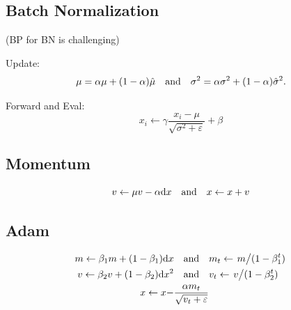 \documentclass[a4paper,landscape]{article}
\begin{document}
\begin{tiny}
\begin{multicols}{4}
\begin{md}
			\subsection{Batch Normalization} (BP for BN is challenging)

			Update:
			\[
				\mu = \alpha\mu + (1-\alpha)\hat{\mu}
				\qand
				\sigma^2 = \alpha\sigma^2 + (1-\alpha)\hat{\sigma}^2
				.\]

			Forward and Eval:
			\[
				x_i\gets \gamma \frac{x_i-\mu}{\sqrt{\sigma^2+\varepsilon}}+\beta
			\]

			\subsection{Momentum}
			\[
				v\gets\mu v-\alpha\dd x \qand x\gets x+v
			\]

			\subsection{Adam}
			\[
				\begin{aligned}
					m\gets\beta_1 m+(1-\beta_1)\dd x
					           & \qand
					m_t \gets \flatfrac{m}{(1-\beta_1^t)}
					\\
					v\gets\beta_2 v+(1-\beta_2)\dd x^2
					           & \qand
					v_t \gets \flatfrac{v}{(1-\beta_2^t)}
					\\
					x \gets x- & \frac{\alpha m_t}{\sqrt{v_t+\varepsilon}}
				\end{aligned}
			\]
		\end{md}
	\end{multicols}
\end{tiny}
\end{document}
